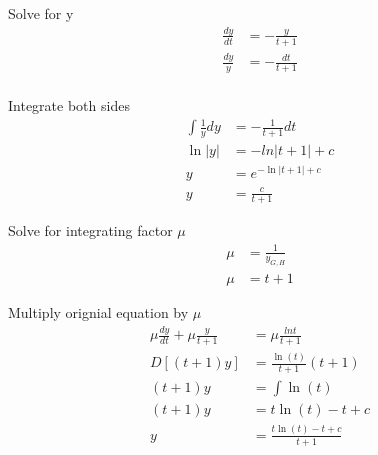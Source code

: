 \documentclass[12pt, letterpaper]{article}
\begin{document}
Solve for y
\begin{align*}
\frac{dy}{dt} &= -\frac{y}{t+1} \\
\frac{dy}{y} &= -\frac{dt}{t+1} \\
\end{align*}

Integrate both sides
\begin{align*}
\int \frac{1}{y} dy &= -\frac{1}{t+1} dt \\
\ln|y| &= -ln|t+1| + c \\
y &= e^{-\ln|t+1| + c} \\
y&= \frac{c}{t+1}
\end{align*}

Solve for integrating factor $\mu$
\begin{align*}
\mu &= \frac{1}{y_{G,H}} \\
\mu &= t+1
\end{align*}


Multiply orignial equation by $\mu$
\begin{align*}
\mu \frac{dy}{dt} + \mu \frac{y}{t+1} &= \mu \frac{lnt}{t+1} \\
D[(t+1)y] &= \frac{\ln(t)}{t+1}(t+1) \\
(t+1)y &= \int \ln(t) \\
(t+1)y &= t\ln(t) - t + c \\
y &= \frac{t\ln(t) - t + c}{t+1}
\end{align*}
\end{document}
